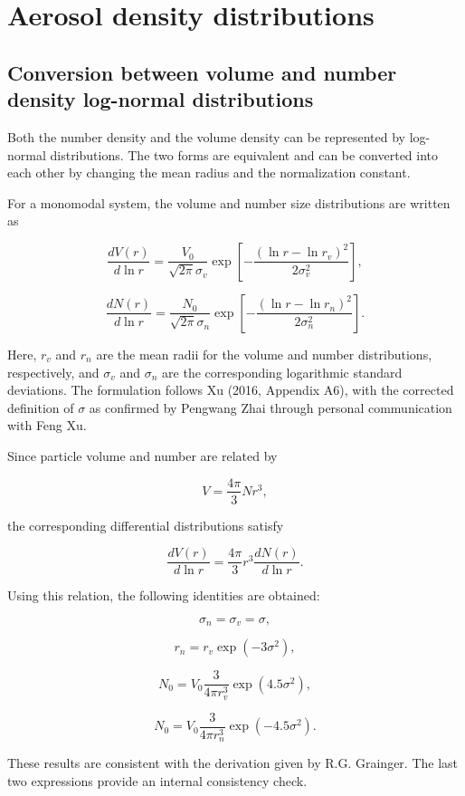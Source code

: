 \documentclass[
  letterpaper,
  open=any]{scrbook}
\begin{document}
\section{Aerosol density
distributions}\label{aerosol-density-distributions}

\subsection{Conversion between volume and number density log-normal
distributions}\label{conversion-between-volume-and-number-density-log-normal-distributions}

Both the number density and the volume density can be represented by
log-normal distributions. The two forms are equivalent and can be
converted into each other by changing the mean radius and the
normalization constant.

For a monomodal system, the volume and number size distributions are
written as

\[
\frac{d V(r)}{d \ln r}= \frac{V_{0}}{\sqrt{2 \pi} \sigma_{v}} \exp\left[-\frac{(\ln r-\ln r_{v})^2}{2 \sigma_{v}^2}\right],
\]

\[
\frac{d N(r)}{d \ln r}= \frac{N_{0}}{\sqrt{2 \pi} \sigma_{n}} \exp\left[-\frac{(\ln r-\ln r_{n})^2}{2 \sigma_{n}^2}\right].
\]

Here, \(r_v\) and \(r_n\) are the mean radii for the volume and number
distributions, respectively, and \(\sigma_v\) and \(\sigma_n\) are the
corresponding logarithmic standard deviations. The formulation follows
Xu (2016, Appendix A6), with the corrected definition of \(\sigma\) as
confirmed by Pengwang Zhai through personal communication with Feng Xu.

Since particle volume and number are related by

\[
V=\frac{4\pi}{3}Nr^3,
\]

the corresponding differential distributions satisfy

\[
\frac{d V(r)}{d \ln r}=\frac{4\pi}{3} r^3 \frac{d N(r)}{d \ln r}.
\]

Using this relation, the following identities are obtained:

\[
\sigma_{n}=\sigma_{v}=\sigma,
\]

\[
r_{n}=r_{v} \exp(-3 \sigma^2),
\]

\[
N_{0}=V_{0} \frac{3}{4 \pi r_{v}^3}\exp(4.5 \sigma^2),
\]

\[
N_{0}=V_{0} \frac{3}{4 \pi r_{n}^3}\exp(-4.5 \sigma^2).
\]

These results are consistent with the derivation given by R.G. Grainger.
The last two expressions provide an internal consistency check.
\end{document}
